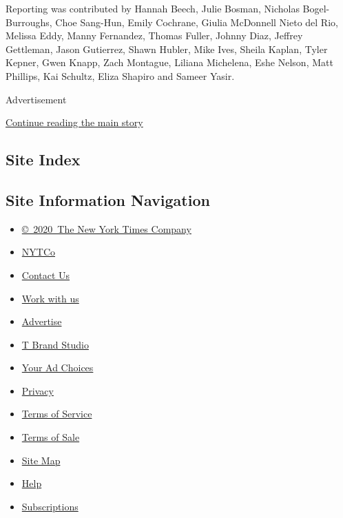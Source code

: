 Reporting was contributed by Hannah Beech, Julie Bosman, Nicholas
Bogel-Burroughs, Choe Sang-Hun, Emily Cochrane, Giulia McDonnell Nieto
del Rio, Melissa Eddy, Manny Fernandez, Thomas Fuller, Johnny Diaz,
Jeffrey Gettleman, Jason Gutierrez, Shawn Hubler, Mike Ives, Sheila
Kaplan, Tyler Kepner, Gwen Knapp, Zach Montague, Liliana Michelena, Eshe
Nelson, Matt Phillips, Kai Schultz, Eliza Shapiro and Sameer Yasir.

Advertisement

\protect\hyperlink{after-bottom}{Continue reading the main story}

\hypertarget{site-index}{%
\subsection{Site Index}\label{site-index}}

\hypertarget{site-information-navigation}{%
\subsection{Site Information
Navigation}\label{site-information-navigation}}

\begin{itemize}
\tightlist
\item
  \href{https://help.nytimes.com/hc/en-us/articles/115014792127-Copyright-notice}{©~2020~The
  New York Times Company}
\end{itemize}

\begin{itemize}
\tightlist
\item
  \href{https://www.nytco.com/}{NYTCo}
\item
  \href{https://help.nytimes.com/hc/en-us/articles/115015385887-Contact-Us}{Contact
  Us}
\item
  \href{https://www.nytco.com/careers/}{Work with us}
\item
  \href{https://nytmediakit.com/}{Advertise}
\item
  \href{http://www.tbrandstudio.com/}{T Brand Studio}
\item
  \href{https://www.nytimes.com/privacy/cookie-policy\#how-do-i-manage-trackers}{Your
  Ad Choices}
\item
  \href{https://www.nytimes.com/privacy}{Privacy}
\item
  \href{https://help.nytimes.com/hc/en-us/articles/115014893428-Terms-of-service}{Terms
  of Service}
\item
  \href{https://help.nytimes.com/hc/en-us/articles/115014893968-Terms-of-sale}{Terms
  of Sale}
\item
  \href{https://spiderbites.nytimes.com}{Site Map}
\item
  \href{https://help.nytimes.com/hc/en-us}{Help}
\item
  \href{https://www.nytimes.com/subscription?campaignId=37WXW}{Subscriptions}
\end{itemize}
